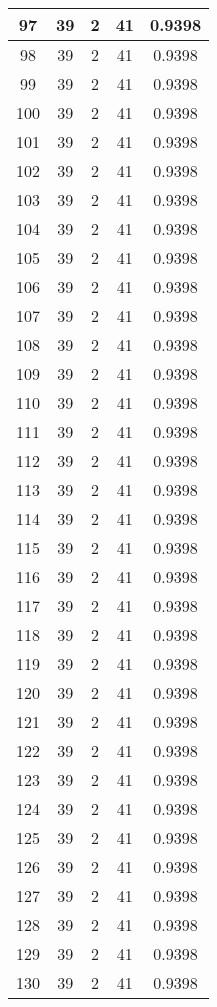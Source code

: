 \documentclass[letterpaper, 12pt]{article}
\begin{document}
\begin{longtable}{|c|c|c|c|c|}
\hline
97 & 39 & 2 & 41 & 0.9398 \\
\hline
98 & 39 & 2 & 41 & 0.9398 \\
\hline
99 & 39 & 2 & 41 & 0.9398 \\
\hline
100 & 39 & 2 & 41 & 0.9398 \\
\hline
101 & 39 & 2 & 41 & 0.9398 \\
\hline
102 & 39 & 2 & 41 & 0.9398 \\
\hline
103 & 39 & 2 & 41 & 0.9398 \\
\hline
104 & 39 & 2 & 41 & 0.9398 \\
\hline
105 & 39 & 2 & 41 & 0.9398 \\
\hline
106 & 39 & 2 & 41 & 0.9398 \\
\hline
107 & 39 & 2 & 41 & 0.9398 \\
\hline
108 & 39 & 2 & 41 & 0.9398 \\
\hline
109 & 39 & 2 & 41 & 0.9398 \\
\hline
110 & 39 & 2 & 41 & 0.9398 \\
\hline
111 & 39 & 2 & 41 & 0.9398 \\
\hline
112 & 39 & 2 & 41 & 0.9398 \\
\hline
113 & 39 & 2 & 41 & 0.9398 \\
\hline
114 & 39 & 2 & 41 & 0.9398 \\
\hline
115 & 39 & 2 & 41 & 0.9398 \\
\hline
116 & 39 & 2 & 41 & 0.9398 \\
\hline
117 & 39 & 2 & 41 & 0.9398 \\
\hline
118 & 39 & 2 & 41 & 0.9398 \\
\hline
119 & 39 & 2 & 41 & 0.9398 \\
\hline
120 & 39 & 2 & 41 & 0.9398 \\
\hline
121 & 39 & 2 & 41 & 0.9398 \\
\hline
122 & 39 & 2 & 41 & 0.9398 \\
\hline
123 & 39 & 2 & 41 & 0.9398 \\
\hline
124 & 39 & 2 & 41 & 0.9398 \\
\hline
125 & 39 & 2 & 41 & 0.9398 \\
\hline
126 & 39 & 2 & 41 & 0.9398 \\
\hline
127 & 39 & 2 & 41 & 0.9398 \\
\hline
128 & 39 & 2 & 41 & 0.9398 \\
\hline
129 & 39 & 2 & 41 & 0.9398 \\
\hline
130 & 39 & 2 & 41 & 0.9398 \\

\end{longtable}
\end{document}
